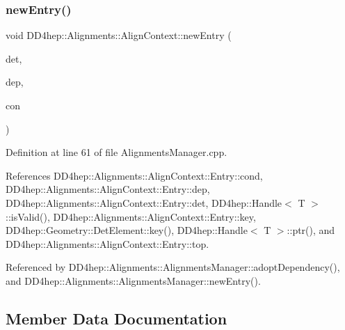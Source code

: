 \subsubsection{\texorpdfstring{new\+Entry()}{newEntry()}}
{\footnotesize\ttfamily void D\+D4hep\+::\+Alignments\+::\+Align\+Context\+::new\+Entry (\begin{DoxyParamCaption}\item[{\hyperlink{class_d_d4hep_1_1_geometry_1_1_det_element}{Det\+Element}}]{det,  }\item[{const \hyperlink{namespace_d_d4hep_1_1_alignments_a94aaf200a47dbbcf42c8769eb623ea60}{Dependency} $\ast$}]{dep,  }\item[{\hyperlink{class_d_d4hep_1_1_alignments_1_1_alignment_condition_aad9d743ab04b8eb38063249c6a9e16c0}{Alignment\+Condition\+::\+Object} $\ast$}]{con }\end{DoxyParamCaption})\hspace{0.3cm}{\ttfamily [inline]}}



Definition at line 61 of file Alignments\+Manager.\+cpp.



References D\+D4hep\+::\+Alignments\+::\+Align\+Context\+::\+Entry\+::cond, D\+D4hep\+::\+Alignments\+::\+Align\+Context\+::\+Entry\+::dep, D\+D4hep\+::\+Alignments\+::\+Align\+Context\+::\+Entry\+::det, D\+D4hep\+::\+Handle$<$ T $>$\+::is\+Valid(), D\+D4hep\+::\+Alignments\+::\+Align\+Context\+::\+Entry\+::key, D\+D4hep\+::\+Geometry\+::\+Det\+Element\+::key(), D\+D4hep\+::\+Handle$<$ T $>$\+::ptr(), and D\+D4hep\+::\+Alignments\+::\+Align\+Context\+::\+Entry\+::top.



Referenced by D\+D4hep\+::\+Alignments\+::\+Alignments\+Manager\+::adopt\+Dependency(), and D\+D4hep\+::\+Alignments\+::\+Alignments\+Manager\+::new\+Entry().



\subsection{Member Data Documentation}
\hypertarget{class_d_d4hep_1_1_alignments_1_1_align_context_a752624c02c61692d9e56cfccd43adaa7}{}\label{class_d_d4hep_1_1_alignments_1_1_align_context_a752624c02c61692d9e56cfccd43adaa7} 

